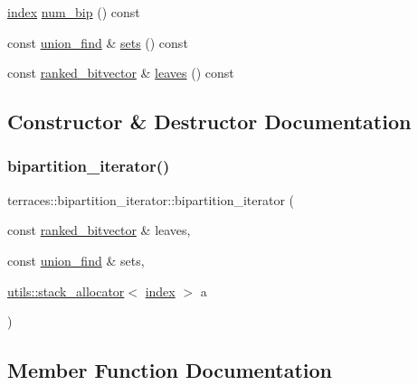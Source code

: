 \begin{DoxyCompactItemize}
\item 
\hyperlink{namespaceterraces_adbc33ccb543d1634e96d0eb02e472c77}{index} \hyperlink{classterraces_1_1bipartition__iterator_a6faec2db72f4a8faee4d977a18e97540}{num\+\_\+bip} () const
\item 
const \hyperlink{classterraces_1_1union__find}{union\+\_\+find} \& \hyperlink{classterraces_1_1bipartition__iterator_adf63f745fee83552648553ddb0530a3b}{sets} () const
\item 
const \hyperlink{namespaceterraces_acc45ec9c561024c50ecbce5b6738ba08}{ranked\+\_\+bitvector} \& \hyperlink{classterraces_1_1bipartition__iterator_ae3aa95923d3d8004050240f37aea6e65}{leaves} () const
\end{DoxyCompactItemize}


\subsection{Constructor \& Destructor Documentation}
\mbox{\label{classterraces_1_1bipartition__iterator_a5276cb73a4ee31aace8cc8424eda534f}} 
\subsubsection{\texorpdfstring{bipartition\+\_\+iterator()}{bipartition\_iterator()}}
{\footnotesize\ttfamily terraces\+::bipartition\+\_\+iterator\+::bipartition\+\_\+iterator (\begin{DoxyParamCaption}\item[{const \hyperlink{namespaceterraces_acc45ec9c561024c50ecbce5b6738ba08}{ranked\+\_\+bitvector} \&}]{leaves,  }\item[{const \hyperlink{classterraces_1_1union__find}{union\+\_\+find} \&}]{sets,  }\item[{\hyperlink{classterraces_1_1utils_1_1stack__allocator}{utils\+::stack\+\_\+allocator}$<$ \hyperlink{namespaceterraces_adbc33ccb543d1634e96d0eb02e472c77}{index} $>$}]{a }\end{DoxyParamCaption})}



\subsection{Member Function Documentation}
\mbox{\label{classterraces_1_1bipartition__iterator_afc11c289f64dd48723ff88e70d67af37}} 

